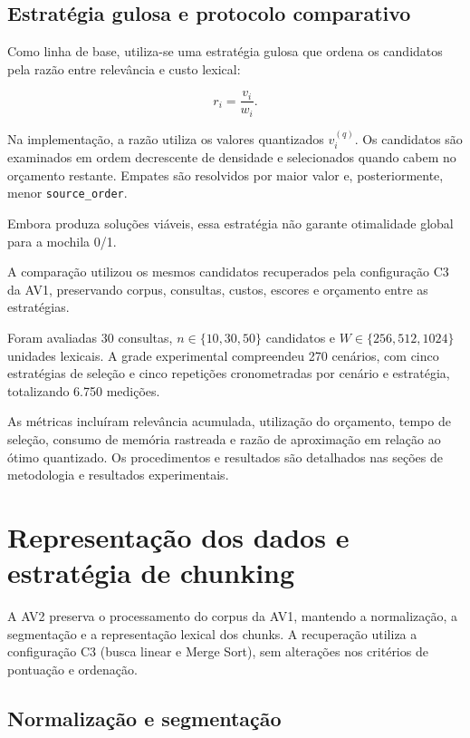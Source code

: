 \documentclass[11pt,a4paper]{article}
\theoremstyle{plain}
\theoremstyle{definition}
\theoremstyle{plain}
\begin{document}
\subsection{Estratégia gulosa e protocolo comparativo}

Como linha de base, utiliza-se uma estratégia
gulosa que ordena os candidatos pela razão
entre relevância e custo lexical:

\begin{equation}
r_i=\frac{v_i}{w_i}.
\label{eq:razao_gulosa}
\end{equation}

Na implementação, a razão utiliza os valores
quantizados $v_i^{(q)}$. Os candidatos são
examinados em ordem decrescente de densidade
e selecionados quando cabem no orçamento
restante. Empates são resolvidos por maior
valor e, posteriormente, menor
\texttt{source\_order}.

Embora produza soluções viáveis, essa
estratégia não garante otimalidade global
para a mochila 0/1.


A comparação utilizou os mesmos candidatos
recuperados pela configuração C3 da AV1,
preservando corpus, consultas, custos,
escores e orçamento entre as estratégias.

Foram avaliadas 30 consultas,
$n \in \{10,30,50\}$ candidatos e
$W \in \{256,512,1024\}$ unidades lexicais.
A grade experimental compreendeu 270
cenários, com cinco estratégias de seleção
e cinco repetições cronometradas por cenário
e estratégia, totalizando 6.750 medições.

As métricas incluíram relevância acumulada,
utilização do orçamento, tempo de seleção,
consumo de memória rastreada e razão de
aproximação em relação ao ótimo quantizado.
Os procedimentos e resultados são detalhados
nas seções de metodologia e resultados
experimentais.


\section{Representação dos dados e estratégia de chunking}

A AV2 preserva o processamento do corpus da AV1,
mantendo a normalização, a segmentação e a
representação lexical dos chunks. A recuperação
utiliza a configuração C3 (busca linear e Merge
Sort), sem alterações nos critérios de pontuação
e ordenação.

\subsection{Normalização e segmentação}
\end{document}
